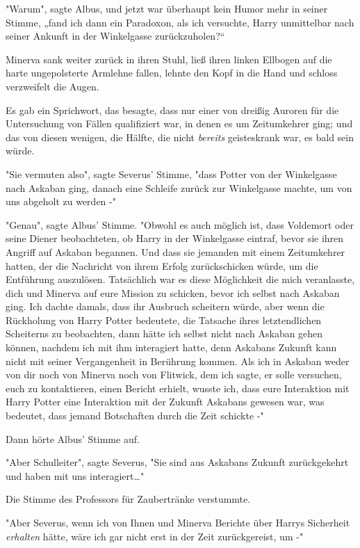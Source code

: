 {"Warum", sagte Albus, und jetzt war überhaupt kein Humor mehr in seiner Stimme, „fand ich dann ein Paradoxon, als ich versuchte, Harry unmittelbar nach seiner Ankunft in der Winkelgasse zurückzuholen?“

Minerva sank weiter zurück in ihren Stuhl, ließ ihren linken Ellbogen auf die harte ungepolsterte Armlehne fallen, lehnte den Kopf in die Hand und schloss verzweifelt die Augen.

Es gab ein Sprichwort, das besagte, dass nur einer von dreißig Auroren für die Untersuchung von Fällen qualifiziert war, in denen es um Zeitumkehrer ging; und das von diesen wenigen, die Hälfte, die nicht \emph{bereits} geisteskrank war, es bald sein würde.

"Sie vermuten also", sagte Severus' Stimme, "dass Potter von der Winkelgasse nach Askaban ging, danach eine Schleife zurück zur Winkelgasse machte, um von uns abgeholt zu werden -"

"Genau", sagte Albus' Stimme. "Obwohl es auch möglich ist, dass Voldemort oder seine Diener beobachteten, ob Harry in der Winkelgasse eintraf, bevor sie ihren Angriff auf Askaban begannen. Und dass sie jemanden mit einem Zeitumkehrer hatten, der die Nachricht von ihrem Erfolg zurückschicken würde, um die Entführung auszulösen. Tatsächlich war es diese Möglichkeit die mich veranlasste, dich und Minerva auf eure Mission zu schicken, bevor ich selbst nach Askaban ging. Ich dachte damals, dass ihr Ausbruch scheitern würde, aber wenn die Rückholung von Harry Potter bedeutete, die Tatsache ihres letztendlichen Scheiterns zu beobachten, dann hätte ich selbst nicht nach Askaban gehen können, nachdem ich mit ihm interagiert hatte, denn Askabans Zukunft kann nicht mit seiner Vergangenheit in Berührung kommen. Als ich in Askaban weder von dir noch von Minerva noch von Flitwick, dem ich sagte, er solle versuchen, euch zu kontaktieren, einen Bericht erhielt, wusste ich, dass eure Interaktion mit Harry Potter eine Interaktion mit der Zukunft Askabans gewesen war, was bedeutet, dass jemand Botschaften durch die Zeit schickte -"

Dann hörte Albus' Stimme auf.

"Aber Schulleiter", sagte Severus, "Sie sind aus Askabans Zukunft zurückgekehrt und haben mit uns interagiert…"

Die Stimme des Professors für Zaubertränke verstummte.

"Aber Severus, wenn ich von Ihnen und Minerva Berichte über Harrys Sicherheit \emph{erhalten} hätte, wäre ich gar nicht erst in der Zeit zurückgereist, um -"

}
